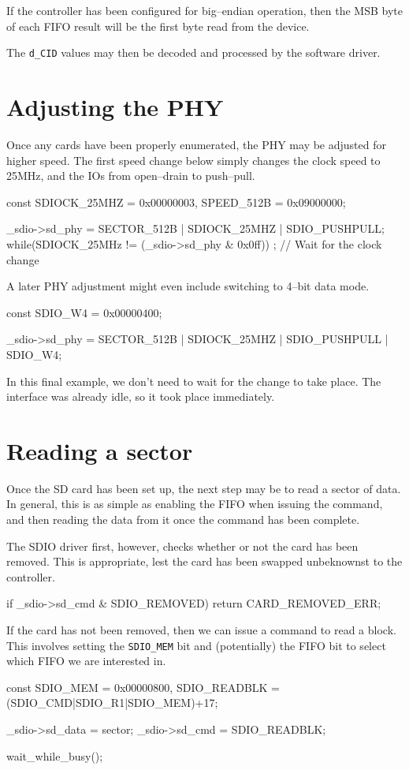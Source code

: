 \documentclass{gqtekspec}
\begin{document}
If the controller has been configured for big--endian operation, then
the MSB byte of each FIFO result will be the first byte read from the
device.

The {\tt d\_CID} values may then be decoded and processed by the software
driver.
\section{Adjusting the PHY}
Once any cards have been properly enumerated, the PHY may be adjusted
for higher speed.  The first speed change below simply changes the clock
speed to 25MHz, and the IOs from open--drain to push--pull.

\begin{CPP}
	const	SDIOCK_25MHZ = 0x00000003,
		SPEED_512B   = 0x09000000;

	_sdio->sd_phy = SECTOR_512B | SDIOCK_25MHZ | SDIO_PUSHPULL;
	while(SDIOCK_25MHz != (_sdio->sd_phy & 0x0ff))
		; // Wait for the clock change
\end{CPP}

A later PHY adjustment might even include switching to 4--bit data mode.

\begin{CPP}
	const	SDIO_W4 = 0x00000400;

	_sdio->sd_phy = SECTOR_512B | SDIOCK_25MHZ | SDIO_PUSHPULL
				| SDIO_W4;
\end{CPP}

In this final example, we don't need to wait for the change to take place.
The interface was already idle, so it took place immediately.
\section{Reading a sector}
Once the SD card has been set up, the next step may be to read a sector
of data.  In general, this is as simple as enabling the FIFO when issuing
the command, and then reading the data from it once the command has been
complete.

The SDIO driver first, however, checks whether or not the card has been
removed.  This is appropriate, lest the card has been swapped unbeknownst
to the controller.
\begin{CPP}
	if _sdio->sd_cmd & SDIO_REMOVED)
		return CARD_REMOVED_ERR;
\end{CPP}

If the card has not been removed, then we can issue a command to read a
block.  This involves setting the {\tt SDIO\_MEM} bit and (potentially) the
FIFO bit to select which FIFO we are interested in.
\begin{CPP}
	const	SDIO_MEM     = 0x00000800,
		SDIO_READBLK = (SDIO_CMD|SDIO_R1|SDIO_MEM)+17;

	_sdio->sd_data = sector;
	_sdio->sd_cmd = SDIO_READBLK;

	wait_while_busy();
\end{CPP}
\end{document}

